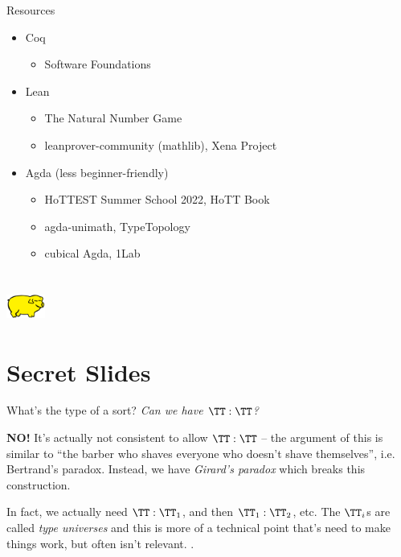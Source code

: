 \documentclass{beamer}
\begin{document}
\begin{frame}{Resources}
  \begin{itemize}
    \item Coq
      \begin{itemize}
        \item Software Foundations
      \end{itemize}
    \item Lean 
      \begin{itemize}
        \item The Natural Number Game
        \item leanprover-community (mathlib), Xena Project  
      \end{itemize}
    \item Agda {\scriptsize(less beginner-friendly)}
      \begin{itemize}
        \item HoTTEST Summer School 2022, HoTT Book
        \item agda-unimath, TypeTopology
        \item cubical Agda, 1Lab 
      \end{itemize}
  \end{itemize}
\end{frame}

\section{\texorpdfstring{\includegraphics[width=36pt]{yellowPig.png}}{P.I.G.}}

\backupbegin

\section{Secret Slides}

\begin{frame}{What's the type of a sort?}
  \emph{Can we have $\TT : \TT$?}
  \pause \vspace{12pt}

  \textbf{NO!} It's actually not consistent to allow $\TT :
    \TT$  -- the argument of this
    is similar to ``the barber who shaves everyone who doesn't shave
    themselves'', i.e. Bertrand's paradox.
    Instead, we have \emph{Girard's
    paradox} which breaks this construction. 
    \pause \vspace{12pt}

    In fact, we actually
    need $\TT : \TT_1$, and then $\TT_1 : \TT_2$, etc. The $\TT_i$s are called
    \emph{type universes} and this is more of a technical point that's need to
    make things work, but often isn't relevant. . 
\end{frame}
\end{document}
